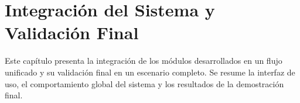 \chapter{Integración del Sistema y Validación Final}
\label{cap:integraciónSistema}

Este capítulo presenta la integración de los módulos desarrollados en un flujo unificado y su validación final en un escenario completo. Se resume la interfaz de uso, el comportamiento global del sistema y los resultados de la demostración final.





